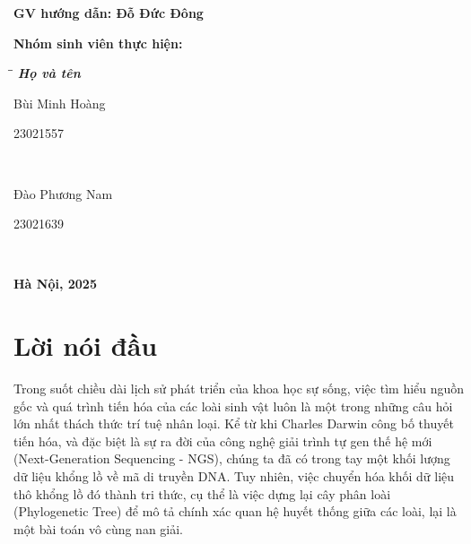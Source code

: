 \documentclass[12pt,a4paper]{report}
\begin{document}
\begin{titlepage}
\vspace{15pt}
\textbf{GV hướng dẫn: Đỗ Đức Đông}



\vspace{10pt}
\textbf{Nhóm sinh viên thực hiện:}

\begin{tabbing}
\hspace{8cm}\=\hspace{3cm}\=\hspace{3cm} \kill
{\it \textbf{Họ và tên}}\\
\begin{bfseries}Bùi Minh Hoàng\end{bfseries}\> \begin{bfseries}23021557\end{bfseries}\\
\begin{bfseries}Đào Phương Nam\end{bfseries}\> \begin{bfseries}23021639\end{bfseries}\\

\end{tabbing}
\vspace{10pt}
\begin{center}
    \textbf{Hà Nội, 2025}
\end{center}
\end{titlepage}

\chapter*{Lời nói đầu}


Trong suốt chiều dài lịch sử phát triển của khoa học sự sống, việc tìm hiểu nguồn gốc và quá trình tiến hóa của các loài sinh vật luôn là một trong những câu hỏi lớn nhất thách thức trí tuệ nhân loại. Kể từ khi Charles Darwin công bố thuyết tiến hóa, và đặc biệt là sự ra đời của công nghệ giải trình tự gen thế hệ mới (Next-Generation Sequencing - NGS), chúng ta đã có trong tay một khối lượng dữ liệu khổng lồ về mã di truyền DNA. Tuy nhiên, việc chuyển hóa khối dữ liệu thô khổng lồ đó thành tri thức, cụ thể là việc dựng lại cây phân loài (Phylogenetic Tree) để mô tả chính xác quan hệ huyết thống giữa các loài, lại là một bài toán vô cùng nan giải.
\end{document}
